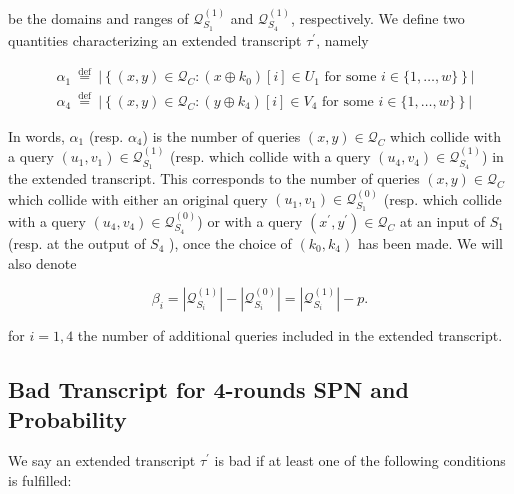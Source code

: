 \noindent be the domains and ranges of $\mathcal{Q}_{S_{1}}^{(1)}$ and $\mathcal{Q}_{S_{4}}^{(1)}$, respectively. We define two quantities characterizing an extended transcript $\tau^{\prime}$, namely

$$
\begin{aligned}
&\alpha_{1} \stackrel{\text { def }}{=} |\left\{(x, y) \in \mathcal{Q}_{C}: \left(x \oplus k_{0}\right)[i] \in U_{1} \text { for some } i \in\{1, \ldots, w\}\right\} |\\
&\alpha_{4} \stackrel{\text { def }}{=} |\left\{(x, y) \in \mathcal{Q}_{C}: \left(y \oplus k_{4}\right)[i] \in V_{4} \text { for some } i \in\{1, \ldots, w\}\right\} |
\end{aligned}
$$

In words, $\alpha_1$ (resp. $\alpha_4$) is the number of queries $(x, y) \in \mathcal{Q}_{C}$ which collide with a query $\left(u_{1}, v_{1}\right) \in \mathcal{Q}_{S_{1}}^{(1)}$ (resp. which collide with a query $\left(u_{4}, v_{4}\right) \in \mathcal{Q}_{S_{4}}^{(1)}$) in the extended transcript. This corresponds to the number of queries $(x, y) \in \mathcal{Q}_{C}$ which collide with either an original query $\left(u_{1}, v_{1}\right) \in \mathcal{Q}_{S_{1}}^{(0)}$ (resp. which collide with a query $\left(u_{4}, v_{4}\right) \in \mathcal{Q}_{S_{4}}^{(0)}$) or with a query $\left(x^{\prime}, y^{\prime}\right) \in \mathcal{Q}_{C}$ at an input of $S_1$ (resp. at the output of $S_4$ ), once the choice of $\left(k_{0}, k_{4}\right)$  has been made. We will also denote

$$
\beta_{i}=\left|\mathcal{Q}_{S_{i}}^{(1)}\right|-\left|\mathcal{Q}_{S_{i}}^{(0)}\right|=\left|\mathcal{Q}_{S_{i}}^{(1)}\right|-p.
$$

for $i=1, 4$ the number of additional queries included in the extended transcript.\\


\subsection{Bad Transcript for 4-rounds SPN and Probability}

\noindent We say an extended transcript $\tau^{\prime}$ is bad if at least one of the following conditions is fulfilled:


